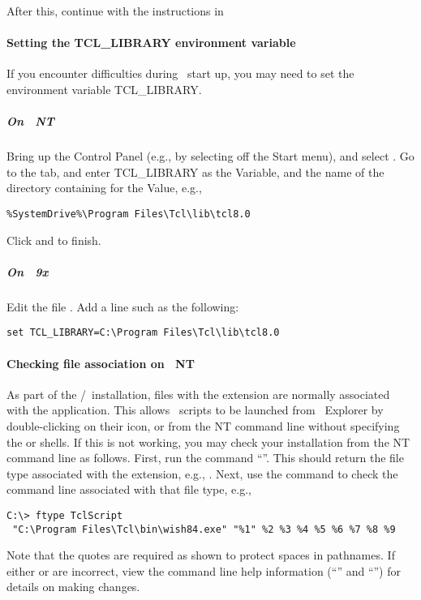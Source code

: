 After this, continue with the instructions in 
 

\paragraph{Setting the TCL\_LIBRARY environment variable}

If you encounter difficulties during \OOMMF\ start up, you may need to set
the environment variable 
TCL\_LIBRARY.  

\subparagraph{On \Windows~NT}
Bring up the Control Panel (e.g., by selecting 
 off the Start menu), and select 
.  Go to the  tab, and enter
TCL\_LIBRARY as the Variable, and the name of the directory containing
 for the Value, e.g.,
\begin{verbatim}
%SystemDrive%\Program Files\Tcl\lib\tcl8.0
\end{verbatim}
Click  and  to finish.

\subparagraph{On \Windows\ 9x}

Edit the file .  Add a line such as the following:
\begin{verbatim}
set TCL_LIBRARY=C:\Program Files\Tcl\lib\tcl8.0
\end{verbatim}

\paragraph{Checking  file association on \Windows~NT}
As part of the \Tcl/\Tk\ installation, files with the 
extension are normally associated with the  application.  This
allows \Tcl\ scripts to be launched from 
\Windows\ Explorer by
double-clicking on their icon, or from the NT command line without
specifying the  or  shells.  If this is not working,
you may check your installation from the NT command line as follows.
First, run the command ``''.  This should return the file
type associated with the  extension, e.g., .
Next, use the  command to check the command line associated
with that file type, e.g.,
%
\begin{verbatim}
C:\> ftype TclScript
 "C:\Program Files\Tcl\bin\wish84.exe" "%1" %2 %3 %4 %5 %6 %7 %8 %9
\end{verbatim}
%
Note that the quotes are required as shown to protect spaces in
pathnames.  If either  or  are incorrect, view the
command line help information (``'' and ``'')
for details on making changes.

